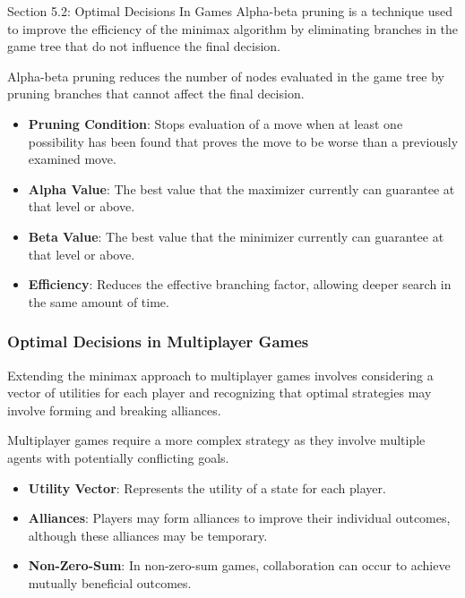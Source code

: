 \begin{notes}{Section 5.2: Optimal Decisions In Games}
    Alpha-beta pruning is a technique used to improve the efficiency of the minimax algorithm by eliminating branches in the game tree that do not influence the final decision.
    
    \begin{highlight}
        Alpha-beta pruning reduces the number of nodes evaluated in the game tree by pruning branches that cannot affect the final decision.
        
        \begin{itemize}
            \item \textbf{Pruning Condition}: Stops evaluation of a move when at least one possibility has been found that proves the move to be worse than a previously examined move.
            \item \textbf{Alpha Value}: The best value that the maximizer currently can guarantee at that level or above.
            \item \textbf{Beta Value}: The best value that the minimizer currently can guarantee at that level or above.
            \item \textbf{Efficiency}: Reduces the effective branching factor, allowing deeper search in the same amount of time.
        \end{itemize}
    \end{highlight}
    
    \subsubsection*{Optimal Decisions in Multiplayer Games}
    
    Extending the minimax approach to multiplayer games involves considering a vector of utilities for each player and recognizing that optimal strategies may involve forming and breaking alliances.
    
    \begin{highlight}
        Multiplayer games require a more complex strategy as they involve multiple agents with potentially conflicting goals.
        
        \begin{itemize}
            \item \textbf{Utility Vector}: Represents the utility of a state for each player.
            \item \textbf{Alliances}: Players may form alliances to improve their individual outcomes, although these alliances may be temporary.
            \item \textbf{Non-Zero-Sum}: In non-zero-sum games, collaboration can occur to achieve mutually beneficial outcomes.
        \end{itemize}
    \end{highlight}
    

\end{notes}
